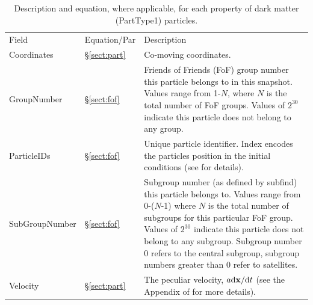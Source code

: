 \documentclass[10pt, a4paper]{article}
\newcommand{\groupnumber}{Friends of Friends (FoF) group number this particle
belongs to in this snapshot. Values range from 1-$N$, where $N$ is the total
number of FoF groups. Values of $2^{30}$ indicate this particle does not belong
to any group.}
\newcommand{\subgroupnumber}{Subgroup number (as defined by {\sc subfind}) this
particle belongs to. Values range from 0-($N$-1) where $N$ is the total number
of subgroups for this particular FoF group. Values of $2^{30}$ indicate this
particle does not belong to any subgroup. Subgroup number 0 refers to the
central subgroup, subgroup numbers greater than 0 refer to satellites.}
\newcommand{\velocity}{The peculiar velocity, $a{\rm d}{\bf x}/{\rm d}t$ (see
the Appendix of \cite{mcalpine2016} for more details).}
\newcommand{\coordinates}{Co-moving coordinates.}
\begin{document}
\begin{table}
\label{table:dm}
\caption{Description and equation, where applicable, for each property of dark matter
(PartType1) particles.}
\begin{center}
\footnotesize
\renewcommand{\arraystretch}{1.5}
\begin{tabular}{>{\ttfamily}p{4cm}p{1.5cm}p{11cm}}
\multicolumn{3}{l}{\large \bf PartType1: Dark Matter} \\
\hline
Field & Equation/Par & Description \\ \hline\hline

Coordinates &
\S\ref{sect:part} &
\coordinates \\

GroupNumber &
\S\ref{sect:fof} &
\groupnumber \\

ParticleIDs &
\S\ref{sect:fof} & Unique particle identifier. Index encodes the particles position in the
initial conditions (see \cite{schaye2015} for details). \\

SubGroupNumber &
\S\ref{sect:fof} &
\subgroupnumber \\

Velocity &
\S\ref{sect:part} & \velocity \\

\hline
\end{tabular}
\end{center}
\end{table}
\end{document}
